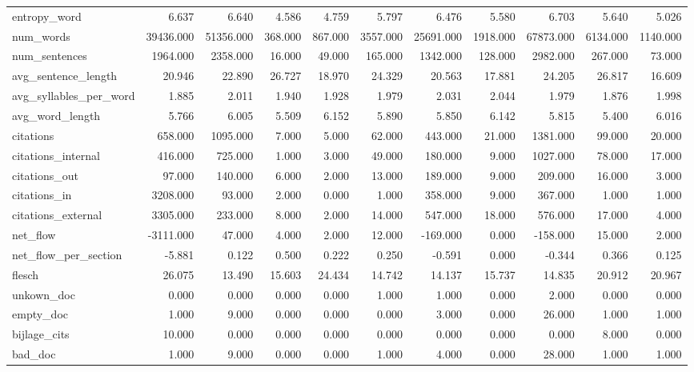 \begin{tabular}{lrrrrrrrrrr}
\cline{1-11}
entropy\_word & 6.637 & 6.640 & 4.586 & 4.759 & 5.797 & 6.476 & 5.580 & 6.703 & 5.640 & 5.026 \\
\cline{1-11}
num\_words & 39436.000 & 51356.000 & 368.000 & 867.000 & 3557.000 & 25691.000 & 1918.000 & 67873.000 & 6134.000 & 1140.000 \\
\cline{1-11}
num\_sentences & 1964.000 & 2358.000 & 16.000 & 49.000 & 165.000 & 1342.000 & 128.000 & 2982.000 & 267.000 & 73.000 \\
\cline{1-11}
avg\_sentence\_length & 20.946 & 22.890 & 26.727 & 18.970 & 24.329 & 20.563 & 17.881 & 24.205 & 26.817 & 16.609 \\
\cline{1-11}
avg\_syllables\_per\_word & 1.885 & 2.011 & 1.940 & 1.928 & 1.979 & 2.031 & 2.044 & 1.979 & 1.876 & 1.998 \\
\cline{1-11}
avg\_word\_length & 5.766 & 6.005 & 5.509 & 6.152 & 5.890 & 5.850 & 6.142 & 5.815 & 5.400 & 6.016 \\
\cline{1-11}
citations & 658.000 & 1095.000 & 7.000 & 5.000 & 62.000 & 443.000 & 21.000 & 1381.000 & 99.000 & 20.000 \\
\cline{1-11}
citations\_internal & 416.000 & 725.000 & 1.000 & 3.000 & 49.000 & 180.000 & 9.000 & 1027.000 & 78.000 & 17.000 \\
\cline{1-11}
citations\_out & 97.000 & 140.000 & 6.000 & 2.000 & 13.000 & 189.000 & 9.000 & 209.000 & 16.000 & 3.000 \\
\cline{1-11}
citations\_in & 3208.000 & 93.000 & 2.000 & 0.000 & 1.000 & 358.000 & 9.000 & 367.000 & 1.000 & 1.000 \\
\cline{1-11}
citations\_external & 3305.000 & 233.000 & 8.000 & 2.000 & 14.000 & 547.000 & 18.000 & 576.000 & 17.000 & 4.000 \\
\cline{1-11}
net\_flow & -3111.000 & 47.000 & 4.000 & 2.000 & 12.000 & -169.000 & 0.000 & -158.000 & 15.000 & 2.000 \\
\cline{1-11}
net\_flow\_per\_section & -5.881 & 0.122 & 0.500 & 0.222 & 0.250 & -0.591 & 0.000 & -0.344 & 0.366 & 0.125 \\
\cline{1-11}
flesch & 26.075 & 13.490 & 15.603 & 24.434 & 14.742 & 14.137 & 15.737 & 14.835 & 20.912 & 20.967 \\
\cline{1-11}
unkown\_doc & 0.000 & 0.000 & 0.000 & 0.000 & 1.000 & 1.000 & 0.000 & 2.000 & 0.000 & 0.000 \\
\cline{1-11}
empty\_doc & 1.000 & 9.000 & 0.000 & 0.000 & 0.000 & 3.000 & 0.000 & 26.000 & 1.000 & 1.000 \\
\cline{1-11}
bijlage\_cits & 10.000 & 0.000 & 0.000 & 0.000 & 0.000 & 0.000 & 0.000 & 0.000 & 8.000 & 0.000 \\
\cline{1-11}
bad\_doc & 1.000 & 9.000 & 0.000 & 0.000 & 1.000 & 4.000 & 0.000 & 28.000 & 1.000 & 1.000 \\
\cline{1-11}
\bottomrule
\end{tabular}
